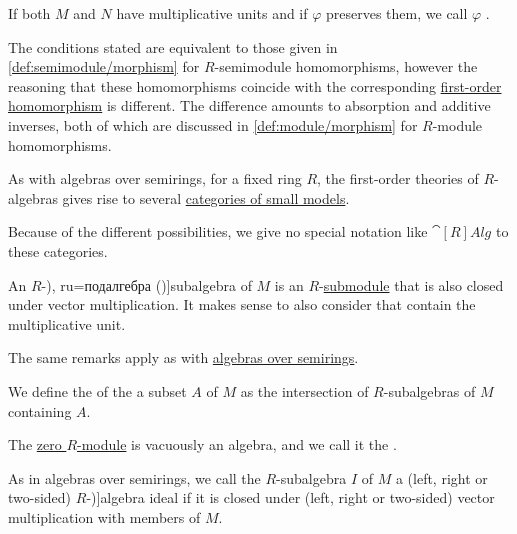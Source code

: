 \begin{definition}
\begin{thmenum}[resume=def:algebra_over_ring]
    If both \( M \) and \( N \) have multiplicative units and if \( \varphi \) preserves them, we call \( \varphi \) .

    The conditions stated are equivalent to those given in \cref{def:semimodule/morphism} for \( R \)-semimodule homomorphisms, however the reasoning that these homomorphisms coincide with the corresponding \hyperref[def:fol_homomorphism]{first-order homomorphism} is different. The difference amounts to absorption and additive inverses, both of which are discussed in \cref{def:module/morphism} for \( R \)-module homomorphisms.

    \mimprovised As with algebras over semirings, for a fixed ring \( R \), the first-order theories of \( R \)-algebras gives rise to several \hyperref[def:fol_theory_model_functor/obj]{categories of small models}.

    Because of the different possibilities, we give no special notation like \( \cat[R]{Alg} \) to these categories.

     An \( R \)-\term[bg=подалгебра (\cite[305]{ГеновМиховскиМоллов1991Алгебра}), ru=подалгебра (\cite[66]{Кострикин2020АлгебраЧасть2})]{subalgebra} of \( M \) is an \( R \)-\hyperref[def:module/subobject]{submodule} that is also closed under vector multiplication. It makes sense to also consider  that contain the multiplicative unit.

    The same remarks apply as with \hyperref[def:algebra_over_semiring]{algebras over semirings}.

     We define the  of the a subset \( A \) of \( M \) as the intersection of \( R \)-subalgebras of \( M \) containing \( A \).

     The \hyperref[def:module/trivial]{zero \( R \)-module} is vacuously an algebra, and we call it the .

     As in algebras over semirings, we call the \( R \)-subalgebra \( I \) of \( M \) a (left, right or two-sided) \( R \)-\term[en=ideal (\cite[430]{Bourbaki1998Algebra1to3})]{algebra ideal} if it is closed under (left, right or two-sided) vector multiplication with members of \( M \).


\end{thmenum}
\end{definition}
